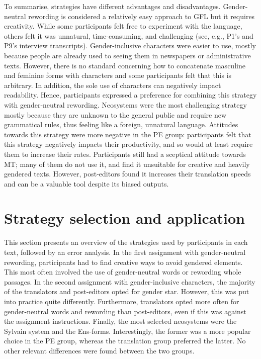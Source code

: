 To summarise, strategies have different advantages and disadvantages. Gender-neutral rewording is considered a relatively easy approach to GFL but it requires creativity. While some participants felt free to experiment with the language, others felt it was unnatural, time-consuming, and challenging (see, e.g., P1's and P9's interview transcripts). Gender-inclusive characters were easier to use, mostly because people are already used to seeing them in newspapers or administrative texts. However, there is no standard concerning how to concatenate masculine and feminine forms with characters and some participants felt that this is arbitrary. In addition, the sole use of characters can negatively impact readability. Hence, participants expressed a preference for combining this strategy with gender-neutral rewording. Neosystems were the most challenging strategy mostly because they are unknown to the general public and require new grammatical rules, thus feeling like a foreign, unnatural language. Attitudes towards this strategy were more negative in the PE group: participants felt that this strategy negatively impacts their productivity, and so would at least require them to increase their rates. Participants still had a sceptical attitude towards MT; many of them do not use it, and find it unsuitable for creative and heavily gendered texts. However, post-editors found it increases their translation speeds and can be a valuable tool despite its biased outputs. 





\section{Strategy selection and application} \label{sec:strategiesused}
This section presents an overview of the strategies used by participants in each text, followed by an error analysis. In the first assignment with gender-neutral rewording, participants had to find creative ways to avoid gendered elements. This most often involved the use of gender-neutral words or rewording whole passages. In the second assignment with gender-inclusive characters, the majority of the translators and post-editors opted for gender star. However, this was put into practice quite differently. Furthermore, translators opted more often for gender-neutral words and rewording than post-editors, even if this was against the assignment instructions. Finally, the most selected neosystems were the Sylvain system and the Ens-forms. Interestingly, the former was a more popular choice in the PE group, whereas the translation group preferred the latter. No other relevant differences were found between the two groups. 

